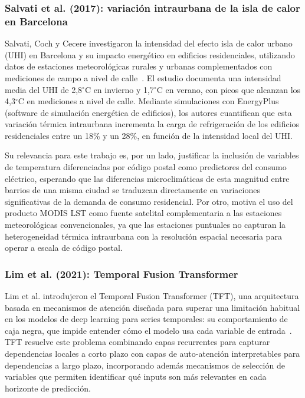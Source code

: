 \documentclass[12pt, a4paper]{article}
\begin{document}
\subsubsection{Salvati et al. (2017): variación intraurbana de la isla de calor en Barcelona}

Salvati, Coch y Cecere investigaron la intensidad del efecto isla de calor urbano (UHI) en Barcelona y su impacto energético en edificios residenciales, utilizando datos de estaciones meteorológicas rurales y urbanas complementados con mediciones de campo a nivel de calle~\cite{salvati2017}. El estudio documenta una intensidad media del UHI de 2,8$^\circ$C en invierno y 1,7$^\circ$C en verano, con picos que alcanzan los 4,3$^\circ$C en mediciones a nivel de calle. Mediante simulaciones con EnergyPlus (software de simulación energética de edificios), los autores cuantifican que esta variación térmica intraurbana incrementa la carga de refrigeración de los edificios residenciales entre un 18\% y un 28\%, en función de la intensidad local del UHI.

Su relevancia para este trabajo es, por un lado, justificar la inclusión de variables de temperatura diferenciadas por código postal como predictores del consumo eléctrico, esperando que las diferencias microclimáticas de esta magnitud entre barrios de una misma ciudad se traduzcan directamente en variaciones significativas de la demanda de consumo residencial. Por otro, motiva el uso del producto MODIS LST como fuente satelital complementaria a las estaciones meteorológicas convencionales, ya que las estaciones puntuales no capturan la heterogeneidad térmica intraurbana con la resolución espacial necesaria para operar a escala de código postal.

\subsubsection{Lim et al. (2021): Temporal Fusion Transformer}

Lim et al. introdujeron el Temporal Fusion Transformer (TFT), una arquitectura basada en mecanismos de atención diseñada para superar una limitación habitual en los modelos de deep learning para series temporales: su comportamiento de caja negra, que impide entender cómo el modelo usa cada variable de entrada~\cite{lim2021}. TFT resuelve este problema combinando capas recurrentes para capturar dependencias locales a corto plazo con capas de auto-atención interpretables para dependencias a largo plazo, incorporando además mecanismos de selección de variables que permiten identificar qué inputs son más relevantes en cada horizonte de predicción.
\end{document}
